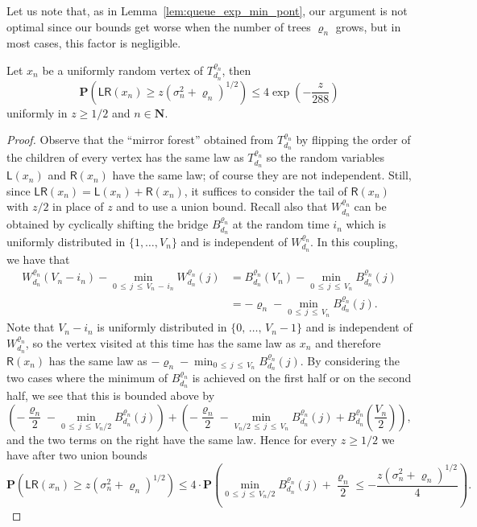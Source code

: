 \documentclass[AHL,Unicode,longabstracts,published]{cedram}
\newcommand{\ensembles}[1]{\mathbf{#1}}
\newcommand{\N}{\ensembles{N}}
\renewcommand{\P}{\ensembles{P}}
\renewcommand{\Pr}[1]{\P\left(#1\right)}
\newcommand{\1}{\ensembles{1}}
\renewcommand{\le}{\leqslant}
\renewcommand{\ge}{\geqslant}
\newcommand{\LL}{\mathsf{L}}
\newcommand{\RR}{\mathsf{R}}
\newcommand{\LR}{\mathsf{LR}}
\newcommand{\fn}{T_{d_n}^{\varrho_n}}
\newcommand{\Wfn}{W_{d_n}^{\varrho_n}}
\newcommand{\Bfn}{B_{d_n}^{\varrho_n}}
\newcommand{\vertices}{V}
\begin{document}
Let us note that, as in Lemma~\ref{lem:queue_exp_min_pont}, our argument is not optimal since our bounds get worse when the number of trees $\varrho_n$ grows, but in most cases, this factor is negligible.


\begin{prop}\label{prop:queues_exp_Luka}
Let $x_n$ be a uniformly random vertex of $\fn$, then
\[
\Pr{\LR(x_n) \ge z \left(\sigma_n^2+\varrho_n\right)^{1/2}} \le 4 \exp\left(- \frac{z}{288}\right)
\]
uniformly in $z \ge 1/2$ and $n \in \N$.
\end{prop}



\begin{proof}
Observe that the ``mirror forest'' obtained from $\fn$ by flipping the order of the children of every vertex has the same law as $\fn$ so the random variables $\LL(x_n)$ and $\RR(x_n)$ have the same law; of course they are not independent. Still, since $\LR(x_n) = \LL(x_n)+\RR(x_n)$, it suffices to consider the tail of $\RR(x_n)$ with $z/2$ in place of $z$ and to use a union bound. Recall also that $\Wfn$ can be obtained by cyclically shifting the bridge $\Bfn$ at the random time $i_n$ which is uniformly distributed in $\{1, \dots, \vertices_n\}$ and is independent of $\Wfn$. In this coupling, we have that
\begin{align*}
\Wfn\left(\vertices_n - i_n\right) - \min_{0\,\le\,j\,\le\,\vertices_n\,-\,i_n} \Wfn(j) &= \Bfn\left(\vertices_n\right) - \min_{0\,\le\,j\,\le\, \vertices_n} \Bfn(j)
\\
&= -\varrho_n - \min_{0\,\le\,j\,\le\,\vertices_n} \Bfn(j).
\end{align*}
Note that $\vertices_n - i_n$ is uniformly distributed in $\{0,\,\dots,\,\vertices_n - 1\}$ and is independent of $\Wfn$, so the vertex visited at this time has the same law as $x_n$ and therefore $\RR(x_n)$ has the same law as $-\varrho_n - \min_{0\,\le\,j\,\le\,\vertices_n} \Bfn(j)$. By considering the two cases where the minimum of $\Bfn$ is achieved on the first half or on the second half, we see that this is bounded above by
\[
\left(- \frac{\varrho_n}{2} - \min_{0\,\le\,j\,\le\, \vertices_n/2} \Bfn(j)\right) + \left(- \frac{\varrho_n}{2} - \min_{\vertices_n/2\,\le\,j\,\le\,\vertices_n} \Bfn(j) + \Bfn\left(\frac{\vertices_n}{2}\right)\right),
\]
and the two terms on the right have the same law. Hence for every $z \ge 1/2$ we have after two union bounds
\[
\Pr{\LR(x_n) \ge z \left(\sigma_n^2+\varrho_n\right)^{1/2}}
\le 4 \cdot \Pr{\min_{0\,\le\,j\,\le\,\vertices_n/2} \Bfn(j) + \frac{\varrho_n}{2} \le - \frac{z \left(\sigma_n^2+\varrho_n\right)^{1/2}}{4}}.
\]
\end{proof}
\end{document}

